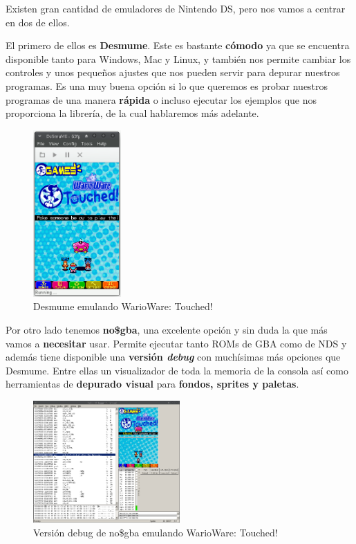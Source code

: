\vspace{0.5cm}

Existen gran cantidad de emuladores de Nintendo DS, pero nos vamos a centrar en dos de ellos.

\vspace{0.5cm}

El primero de ellos es \textbf{Desmume}. Este es bastante \textbf{cómodo} ya que se encuentra disponible tanto para Windows, Mac y Linux, y también nos permite cambiar los controles y unos pequeños ajustes que nos pueden servir para depurar nuestros programas. Es una muy buena opción si lo que queremos es probar nuestros programas de una manera \textbf{rápida} o incluso ejecutar los ejemplos que nos proporciona la librería, de la cual hablaremos más adelante.

\clearpage

\begin{figure}[htbp]
\centering
  \includegraphics[width=0.3\textwidth]{archivos/desmume.png}
  \caption{Desmume emulando WarioWare: Touched!}
  \label{fig:desmume}
\end{figure}

\vspace{0.5cm}

Por otro lado tenemos \textbf{no\$gba}, una excelente opción y sin duda la que más vamos a \textbf{necesitar} usar. Permite ejecutar tanto ROMs de GBA como de NDS y además tiene disponible una \textbf{versión \textit{debug}} con muchísimas más opciones que Desmume. Entre ellas un visualizador de toda la memoria de la consola así como herramientas de \textbf{depurado visual} para \textbf{fondos, sprites y paletas}.

\clearpage
\begin{figure}[htbp]
\centering
  \includegraphics[width=0.5\textwidth]{archivos/nogba.png}
  \caption{Versión debug de no\$gba emulando WarioWare: Touched!}
  \label{fig:nogba}
\end{figure}

